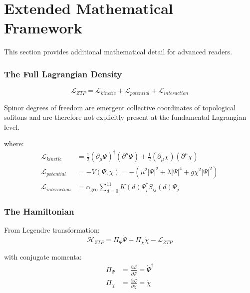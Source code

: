 \documentclass[11pt,a4paper]{book}
\theoremstyle{remark}
\newcommand{\Lagr}{\mathcal{L}}
\newcommand{\Ham}{\mathcal{H}}
\newcommand{\alphageo}{\alpha_{\text{geo}}}
\begin{document}
\part{Extended Mathematical Framework}

This section provides additional mathematical detail for advanced readers.

\section{The Full Lagrangian Density}

\begin{equation}
\Lagr_{ZTP} = \Lagr_{kinetic} + \Lagr_{potential} + \Lagr_{interaction}
\end{equation}

Spinor degrees of freedom are emergent collective coordinates of topological solitons and are therefore not explicitly present at the fundamental Lagrangian level.

where:
\begin{align}
\Lagr_{kinetic} &= \frac{1}{2}(\partial_\mu \Psi)^\dagger (\partial^\mu \Psi) + \frac{1}{2}(\partial_\mu \chi)(\partial^\mu \chi) \\
\Lagr_{potential} &= -V(\Psi, \chi) = -\left(\mu^2 |\Psi|^2 + \lambda |\Psi|^4 + g\chi^2|\Psi|^2\right) \\
\Lagr_{interaction} &= \alphageo \sum_{d=0}^{11} K(d) \Psi^\dagger_i S_{ij}(d) \Psi_j
\end{align}

\section{The Hamiltonian}

From Legendre transformation:
\begin{equation}
\Ham_{ZTP} = \Pi_\Psi \dot{\Psi} + \Pi_\chi \dot{\chi} - \Lagr_{ZTP}
\end{equation}

with conjugate momenta:
\begin{align}
\Pi_\Psi &= \frac{\partial \Lagr}{\partial \dot{\Psi}} = \dot{\Psi}^\dagger \\
\Pi_\chi &= \frac{\partial \Lagr}{\partial \dot{\chi}} = \dot{\chi}
\end{align}
\end{document}
